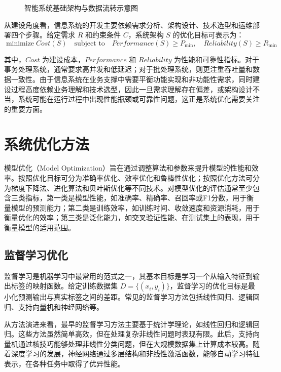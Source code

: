\begin{figure}[htbp]
  \centering
  \caption{智能系统基础架构与数据流转示意图}
  \label{fig:ch2-system-structure}
\end{figure}

从建设角度看，信息系统的开发主要依赖需求分析、架构设计、技术选型和运维部署四个步骤。给定需求 \(R\) 和约束条件 \(C\)，系统架构 \(S\) 的优化目标可表示为：
\begin{equation}
  \operatorname{minimize} Cost(S) \quad \text{subject to} \quad Performance(S) \geq P_{\min}, \quad Reliability(S) \geq R_{\min}
\end{equation}

其中，\(Cost\) 为建设成本，\(Performance\) 和 \(Reliability\) 为性能和可靠性指标。对于事务处理系统，通常要求高并发和低延迟；对于批处理系统，则更注重吞吐量和数据一致性。由于信息系统在业务支撑中需要平衡功能实现和非功能性需求，同时建设过程高度依赖业务理解和技术选型，因此一旦需求理解存在偏差，或架构设计不当，系统可能在运行过程中出现性能瓶颈或可靠性问题，这正是系统优化需要关注的重要方面。

\section{系统优化方法}\label{sec:ch2-optimization}

模型优化（Model Optimization）旨在通过调整算法和参数来提升模型的性能和效率。按照优化目标可分为准确率优化、效率优化和鲁棒性优化；按照优化方法可分为梯度下降法、进化算法和贝叶斯优化等不同技术。对模型优化的评估通常至少包含三类指标，第一类是模型性能，如准确率、精确率、召回率或F1分数，用于衡量模型的预测能力；第二类是训练效率，如训练时间、收敛速度和资源消耗，用于衡量优化的效率；第三类是泛化能力，如交叉验证性能、在测试集上的表现，用于衡量模型的适用范围。

\subsection{监督学习优化}\label{sec:ch2-supervised}

监督学习是机器学习中最常用的范式之一，其基本目标是学习一个从输入特征到输出标签的映射函数。给定训练数据集 \(D=\{(x_i,y_i)\}\)，监督学习的优化目标是最小化预测输出与真实标签之间的差距。常见的监督学习方法包括线性回归、逻辑回归、支持向量机和神经网络等。

从方法演进来看，最早的监督学习方法主要基于统计学理论，如线性回归和逻辑回归。这些方法虽然简单高效，但在处理复杂非线性问题时表现有限。此后，支持向量机通过核技巧能够处理非线性分类问题，但在大规模数据集上计算成本较高。随着深度学习的发展，神经网络通过多层结构和非线性激活函数，能够自动学习特征表示，在各种任务中取得了优异性能。

